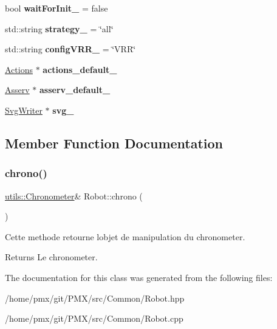 \begin{DoxyCompactItemize}
bool {\bfseries wait\+For\+Init\+\_\+} = false
\item 
\mbox{\label{classRobot_a677b1c9948d64739bbd164b8f54e7b72}} 
std\+::string {\bfseries strategy\+\_\+} = \char`\"{}all\char`\"{}
\item 
\mbox{\label{classRobot_ac2de73c9b53cf46da205f71c65d1d420}} 
std\+::string {\bfseries config\+V\+R\+R\+\_\+} = \char`\"{}V\+RR\char`\"{}
\item 
\mbox{\label{classRobot_aaf04b12e0f7d6711820efe4581001da1}} 
\hyperlink{classActions}{Actions} $\ast$ {\bfseries actions\+\_\+default\+\_\+}
\item 
\mbox{\label{classRobot_ac0e7fdd5427f0db8122cff0e19acfd5f}} 
\hyperlink{classAsserv}{Asserv} $\ast$ {\bfseries asserv\+\_\+default\+\_\+}
\item 
\mbox{\label{classRobot_ae22e94470ca7230c76ff531d940cdd68}} 
\hyperlink{classSvgWriter}{Svg\+Writer} $\ast$ {\bfseries svg\+\_\+}
\end{DoxyCompactItemize}


\subsection{Member Function Documentation}
\mbox{\label{classRobot_a7af430452b558088757324f857d099b2}} 
\subsubsection{\texorpdfstring{chrono()}{chrono()}}
{\footnotesize\ttfamily \hyperlink{classutils_1_1Chronometer}{utils\+::\+Chronometer}\& Robot\+::chrono (\begin{DoxyParamCaption}{ }\end{DoxyParamCaption})\hspace{0.3cm}{\ttfamily [inline]}}



Cette methode retourne l\textquotesingle{}objet de manipulation du chronometer. 

\begin{DoxyReturn}{Returns}
Le chronometer. 
\end{DoxyReturn}


The documentation for this class was generated from the following files\+:\begin{DoxyCompactItemize}
\item 
/home/pmx/git/\+P\+M\+X/src/\+Common/Robot.\+hpp\item 
/home/pmx/git/\+P\+M\+X/src/\+Common/Robot.\+cpp\end{DoxyCompactItemize}
